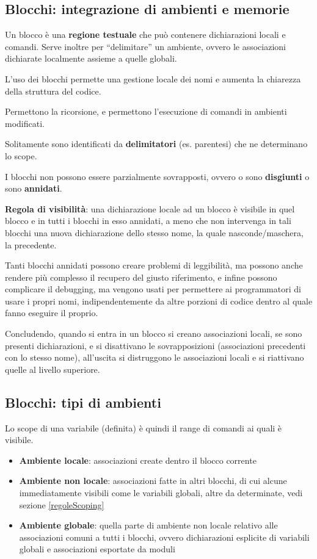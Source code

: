 \documentclass[12pt,a4paper]{article}
\begin{document}
\subsection{Blocchi: integrazione di ambienti e memorie}
Un blocco è una \textbf{regione testuale} che può contenere dichiarazioni locali e comandi. Serve inoltre per ``delimitare'' un ambiente, ovvero le associazioni dichiarate localmente assieme a quelle globali. 

L'uso dei blocchi permette una gestione locale dei nomi e aumenta la chiarezza della struttura del codice.

Permettono la ricorsione, e permettono l'esecuzione di comandi in ambienti modificati.

Solitamente sono identificati da \textbf{delimitatori} (es. parentesi) che ne determinano lo scope.

I blocchi non possono essere parzialmente sovrapposti, ovvero o sono \textbf{disgiunti} o sono \textbf{annidati}.

\textbf{Regola di visibilità}: una dichiarazione locale ad un blocco è visibile in quel blocco e in tutti i blocchi in esso annidati, a meno che non intervenga in tali blocchi una nuova dichiarazione dello stesso nome, la quale nasconde\slash maschera, la precedente.

Tanti blocchi annidati possono creare problemi di leggibilità, ma possono anche rendere più complesso il recupero del giusto riferimento, e infine possono complicare il debugging, ma vengono usati per permettere ai programmatori di usare i propri nomi, indipendentemente da altre porzioni di codice dentro al quale fanno eseguire il proprio.

Concludendo, quando si entra in un blocco si creano associazioni locali, se sono presenti dichiarazioni, e si disattivano le sovrapposizioni (associazioni precedenti con lo stesso nome), all'uscita si distruggono le associazioni locali e si riattivano quelle al livello superiore.

\subsection{Blocchi: tipi di ambienti}
Lo scope di una variabile (definita) è quindi il range di comandi ai quali è visibile.
\begin{itemize}
\item \textbf{Ambiente locale}: associazioni create dentro il blocco corrente
\item \textbf{Ambiente non locale}: associazioni fatte in altri blocchi, di cui alcune immediatamente visibili come le variabili globali, altre da determinate, vedi sezione  \ref{regoleScoping}
\item \textbf{Ambiente globale}: quella parte di ambiente non locale relativo alle associazioni comuni a tutti i blocchi, ovvero dichiarazioni esplicite di variabili globali e associazioni esportate da moduli
\end{itemize}
\end{document}

